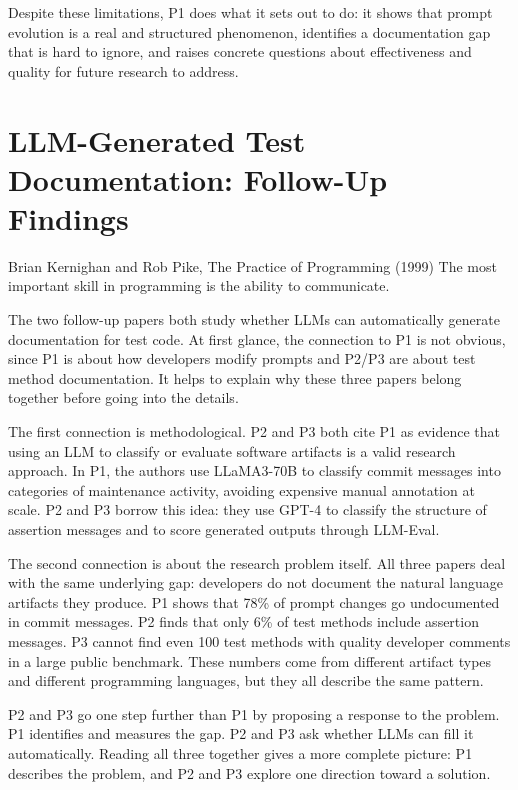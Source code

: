 \documentclass[
    pdftex,
    final,
    11pt,
    a4paper,
    parskip=false,
    oneside,
    footheight=0mm,
    footinclude=false,
    toc=bibliography
]{scrbook}
\begin{document}
Despite these limitations, P1 does what it sets out to do: it shows that prompt evolution is a real and structured phenomenon, identifies a documentation gap that is hard to ignore, and raises concrete questions about effectiveness and quality for future research to address.


\chapter{LLM-Generated Test Documentation: Follow-Up Findings}
\label{ch:followup}

\begin{chapter-quotation}{Brian Kernighan and Rob Pike, The Practice of Programming (1999)}
The most important skill in programming is the ability to communicate.
\end{chapter-quotation}

The two follow-up papers both study whether LLMs can automatically generate documentation for test code. At first glance, the connection to P1 is not obvious, since P1 is about how developers modify prompts and P2/P3 are about test method documentation. It helps to explain why these three papers belong together before going into the details.

The first connection is methodological. P2 and P3 both cite P1 as evidence that using an LLM to classify or evaluate software artifacts is a valid research approach. In P1, the authors use LLaMA3-70B to classify commit messages into categories of maintenance activity, avoiding expensive manual annotation at scale. P2 and P3 borrow this idea: they use GPT-4 to classify the structure of assertion messages and to score generated outputs through LLM-Eval.

The second connection is about the research problem itself. All three papers deal with the same underlying gap: developers do not document the natural language artifacts they produce. P1 shows that 78\% of prompt changes go undocumented in commit messages. P2 finds that only 6\% of test methods include assertion messages. P3 cannot find even 100 test methods with quality developer comments in a large public benchmark. These numbers come from different artifact types and different programming languages, but they all describe the same pattern.

P2 and P3 go one step further than P1 by proposing a response to the problem. P1 identifies and measures the gap. P2 and P3 ask whether LLMs can fill it automatically. Reading all three together gives a more complete picture: P1 describes the problem, and P2 and P3 explore one direction toward a solution.
\end{document}
